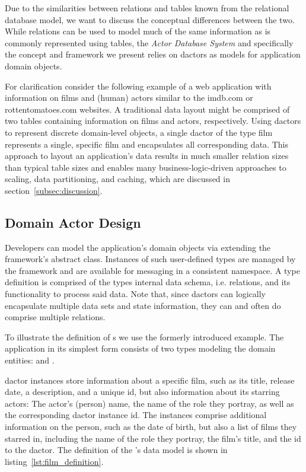 Due to the similarities between relations and tables known from the relational database model, we want to discuss the conceptual differences between the two.
While relations can be used to model much of the same information as is commonly represented using tables, the \textit{Actor Database System} and specifically the concept and framework we present relies on \glspl{dactor} as models for application domain objects.

For clarification consider the following example of a web application with information on films and (human) actors similar to the imdb.com or rottentomatoes.com websites.
A traditional data layout might be comprised of two tables containing information on films and actors, respectively.
Using \glspl{dactor} to represent discrete domain-level objects, a single \gls{dactor} of the type film represents a single, specific film and encapsulates all corresponding data.
This approach to layout an application's data results in much smaller relation sizes than typical table sizes and enables many business-logic-driven approaches to scaling, data partitioning, and caching, which are discussed in section~\ref{subsec:discussion}.

\subsection{Domain Actor Design}\label{subsec:domain_actor_design}

Developers can model the application's domain objects via extending the framework's abstract  class.
Instances of such user-defined  types are managed by the framework and are available for messaging in a consistent namespace.
A  type definition is comprised of the types internal data schema, i.e. relations, and its functionality to process said data.
Note that, since \glspl{dactor} can logically encapsulate multiple data sets and state information, they can and often do comprise multiple relations.

To illustrate the definition of s we use the formerly introduced example.
The application in its simplest form consists of two  types modeling the domain entities:  and .

 \gls{dactor} instances store information about a specific film, such as its title, release date, a description, and a unique id, but also information about its starring actors:
The actor's (person) name, the name of the role they portray, as well as the corresponding \gls{dactor} instance id.
The  instances comprise additional information on the person, such as the date of birth, but also a list of films they starred in, including the name of the role they portray, the film's title, and the id to the  \gls{dactor}.
The definition of the 's data model is shown in listing~\ref{lst:film_definition}.

